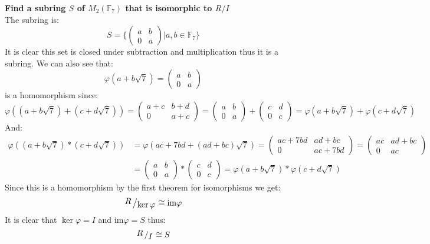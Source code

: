 \documentclass{article}
\theoremstyle{plain}
\newcommand{\F}{\mathbb{F}}
\newcommand{\bigslant}[2]
{{\raisebox{.2em}{$#1$}\left/\raisebox{-.2em}{$#2$}\right.}}
\begin{document}
	\newpage
	
	\textbf{Find a subring $S$ of $M_2(\F_7)$ that is 
    isomorphic to $R/I$} \\
    The subring is:
    \[
        S = \biggr\{\begin{pmatrix}a & b \\0 & a\end{pmatrix} 
        \biggr\vert a,b\in \F_7\biggr\}
    \]
    It is clear this set is closed under subtraction and 
    multiplication thus it is a subring. We can also see that:
    \[
    \varphi(a+b\sqrt{7}) = \begin{pmatrix}a & b \\0 & a\end{pmatrix}
    \]
    is a homomorphism since:
    \[
        \varphi((a+b\sqrt{7}) + (c+d\sqrt{7})) = 
        \begin{pmatrix}a+c & b+d \\0 & a+c\end{pmatrix} = 
        \begin{pmatrix}a & b \\0 & a\end{pmatrix} +
        \begin{pmatrix}c& d \\0 & c\end{pmatrix} = 
        \varphi(a+b\sqrt{7}) +
        \varphi(c+d\sqrt{7})
    \]
    And:
    \begin{align*}
        \varphi((a+b\sqrt{7}) * (c+d\sqrt{7})) &=
        \varphi(ac+7bd + (ad+bc)\sqrt{7}) = 
        \begin{pmatrix}ac+7bd & ad+bc \\0 & ac+7bd\end{pmatrix} = 
        \begin{pmatrix}ac& ad+bc \\0 & ac\end{pmatrix} \\ &= 
        \begin{pmatrix}a & b \\0 & a\end{pmatrix} *
        \begin{pmatrix}c& d \\0 & c\end{pmatrix} = 
        \varphi(a+b\sqrt{7}) * \varphi(c+d\sqrt{7})
    \end{align*}
    Since this is a homomorphism by the first theorem for isomorphisms we get:
    \[
    	\bigslant{R}{\ker\varphi} \cong \text{im}\varphi
    \]
    It is clear that $\ker\varphi = I$ and $\text{im}\varphi=S$
    thus:
    \[
    	\bigslant{R}{I} \cong S
    \]
    
\end{document}
